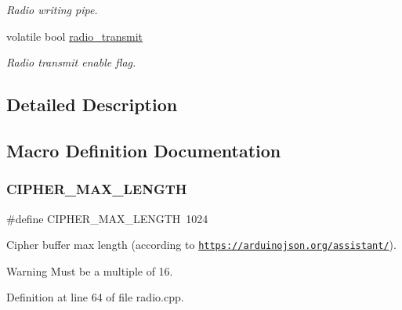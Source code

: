 \begin{DoxyCompactItemize}
\begin{DoxyCompactList}\small\item\em Radio writing pipe. \end{DoxyCompactList}\item 
\mbox{\label{group___radio__module_gaaebbe13533cac0f28446c13ae32b1cb2}} 
volatile bool \mbox{\hyperlink{group___radio__module_gaaebbe13533cac0f28446c13ae32b1cb2}{radio\+\_\+transmit}}
\begin{DoxyCompactList}\small\item\em Radio transmit enable flag. \end{DoxyCompactList}\end{DoxyCompactItemize}


\subsection{Detailed Description}


\subsection{Macro Definition Documentation}
\mbox{\label{group___radio__module_gae634b89476ef10a9d21eacb0da28cd7b}} 
\subsubsection{\texorpdfstring{C\+I\+P\+H\+E\+R\+\_\+\+M\+A\+X\+\_\+\+L\+E\+N\+G\+TH}{CIPHER\_MAX\_LENGTH}}
{\footnotesize\ttfamily \#define C\+I\+P\+H\+E\+R\+\_\+\+M\+A\+X\+\_\+\+L\+E\+N\+G\+TH~1024}



Cipher buffer max length (according to \href{https://arduinojson.org/assistant/}{\tt https\+://arduinojson.\+org/assistant/}). 

\begin{DoxyWarning}{Warning}
Must be a multiple of 16. 
\end{DoxyWarning}


Definition at line 64 of file radio.\+cpp.

\mbox{\label{group___radio__module_ga2e4ba70a12e464d5b5278c18d28355f8}} 
